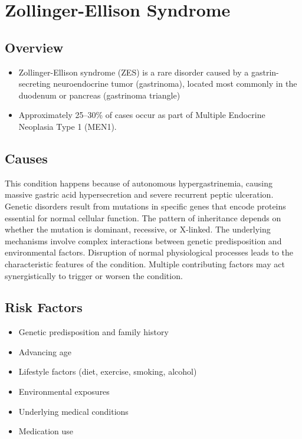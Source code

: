\chapter{Zollinger-Ellison Syndrome}
\label{sec:Zollinger-Ellison Syndrome}

\section{Overview}


\begin{itemize}[noitemsep]
  \item Zollinger-Ellison syndrome (ZES) is a rare disorder caused by a gastrin-secreting neuroendocrine tumor (gastrinoma), located most commonly in the duodenum or pancreas (gastrinoma triangle)
  \item Approximately 25--30\% of cases occur as part of Multiple Endocrine Neoplasia Type 1 (MEN1).
\end{itemize}
\section{Causes}
This condition happens because of autonomous hypergastrinemia, causing massive gastric acid hypersecretion and severe recurrent peptic ulceration. Genetic disorders result from mutations in specific genes that encode proteins essential for normal cellular function. The pattern of inheritance depends on whether the mutation is dominant, recessive, or X-linked. The underlying mechanisms involve complex interactions between genetic predisposition and environmental factors. Disruption of normal physiological processes leads to the characteristic features of the condition. Multiple contributing factors may act synergistically to trigger or worsen the condition.
\section{Risk Factors}


\begin{itemize}[noitemsep]
  \item Genetic predisposition and family history
  \item Advancing age
  \item Lifestyle factors (diet, exercise, smoking, alcohol)
  \item Environmental exposures
  \item Underlying medical conditions
  \item Medication use
\end{itemize}

